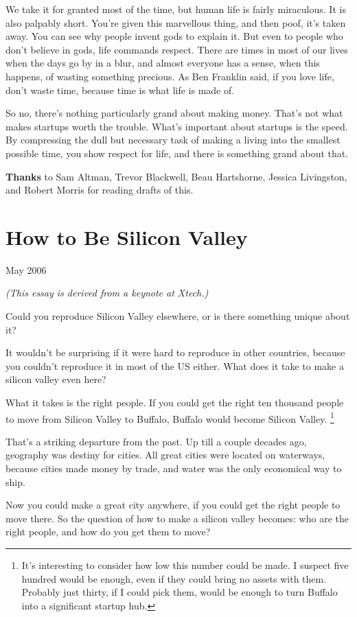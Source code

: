 \documentclass[12pt]{book}
\begin{document}
We take it for granted most of the time, but human life is fairly
miraculous. It is also palpably short. You're given this marvellous
thing, and then poof, it's taken away. You can see why people invent
gods to explain it. But even to people who don't believe in gods, life
commands respect. There are times in most of our lives when the days go
by in a blur, and almost everyone has a sense, when this happens, of
wasting something precious. As Ben Franklin said, if you love life,
don't waste time, because time is what life is made of.

So no, there's nothing particularly grand about making money. That's not
what makes startups worth the trouble. What's important about startups
is the speed. By compressing the dull but necessary task of making a
living into the smallest possible time, you show respect for life, and
there is something grand about that.


\textbf{Thanks} to Sam Altman, Trevor Blackwell, Beau Hartshorne,
Jessica Livingston, and Robert Morris for reading drafts of this.
\chapter{How to Be Silicon Valley}

May 2006

\emph{(This essay is derived from a keynote at Xtech.)}

Could you reproduce Silicon Valley elsewhere, or is there something
unique about it?

It wouldn't be surprising if it were hard to reproduce in other
countries, because you couldn't reproduce it in most of the US either.
What does it take to make a silicon valley even here?

What it takes is the right people. If you could get the right ten
thousand people to move from Silicon Valley to Buffalo, Buffalo would
become Silicon Valley. \footnote{It's interesting to consider how low this number could be made.
I suspect five hundred would be enough, even if they could bring no
assets with them. Probably just thirty, if I could pick them, would be
enough to turn Buffalo into a significant startup hub.}

That's a striking departure from the past. Up till a couple decades ago,
geography was destiny for cities. All great cities were located on
waterways, because cities made money by trade, and water was the only
economical way to ship.

Now you could make a great city anywhere, if you could get the right
people to move there. So the question of how to make a silicon valley
becomes: who are the right people, and how do you get them to move?
\end{document}
